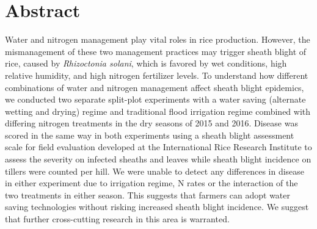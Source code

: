 \documentclass[10pt,letterpaper]{article}
\date{}
\newcommand{\getIndex}[2]{
  \ForEach{,}{\IfEq{#1}{\thislevelitem}{\number\thislevelcount\ExitForEach}{}}{#2}
}
\newcommand{\getAff}[1]{
  \getIndex{#1}{University of Southern Queensland,International Rice Research Institute}
}
\begin{document}
\vspace*{0.2in}

\section*{Abstract}
Water and nitrogen management play vital roles in rice production.
However, the mismanagement of these two management practices may trigger
sheath blight of rice, caused by \emph{Rhizoctonia solani}, which is
favored by wet conditions, high relative humidity, and high nitrogen
fertilizer levels. To understand how different combinations of water and
nitrogen management affect sheath blight epidemics, we conducted two
separate split-plot experiments with a water saving (alternate wetting
and drying) regime and traditional flood irrigation regime combined with
differing nitrogen treatments in the dry seasons of 2015 and 2016.
Disease was scored in the same way in both experiments using a sheath
blight assessment scale for field evaluation developed at the
International Rice Research Institute to assess the severity on infected
sheaths and leaves while sheath blight incidence on tillers were counted
per hill. We were unable to detect any differences in disease in either
experiment due to irrigation regime, N rates or the interaction of the
two treatments in either season. This suggests that farmers can adopt
water saving technologies without risking increased sheath blight
incidence. We suggest that further cross-cutting research in this area
is warranted.
\end{document}
